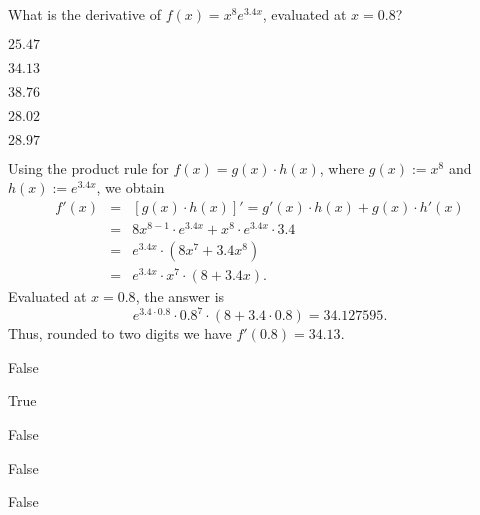 
\begin{question}
What is the derivative of $f(x) = x^{8} e^{3.4x}$, evaluated at $x = 0.8$?

\begin{answerlist}
  \item $25.47$
  \item $34.13$
  \item $38.76$
  \item $28.02$
  \item $28.97$
\end{answerlist}\end{question}

\begin{solution}
Using the product rule for $f(x) = g(x) \cdot h(x)$, where $g(x) := x^{8}$ and $h(x) := e^{3.4x}$, we obtain
\begin{eqnarray*}
f'(x) & = & [g(x) \cdot h(x)]' = g'(x) \cdot h(x) + g(x) \cdot h'(x) \\
      & = & 8 x^{8 - 1} \cdot e^{3.4x} + x^{8} \cdot e^{3.4x} \cdot 3.4 \\
      & = & e^{3.4x} \cdot(8 x^7 + 3.4 x^{8}) \\
      & = & e^{3.4x} \cdot x^7 \cdot (8 + 3.4x).
\end{eqnarray*}
Evaluated at $x = 0.8$, the answer is
\[ e^{3.4\cdot 0.8} \cdot 0.8^7 \cdot (8 + 3.4\cdot 0.8) = 34.127595. \]
Thus, rounded to two digits we have $f'(0.8) = 34.13$.

\begin{answerlist}
  \item False
  \item True
  \item False
  \item False
  \item False
\end{answerlist}\end{solution}

